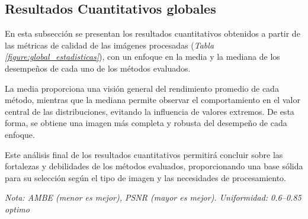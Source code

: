 \documentclass[sigchi]{acmart}
\begin{document}
\subsection{Resultados Cuantitativos globales} \label{subsec:resultados_cuantitativos}

En esta subsección se presentan los resultados cuantitativos obtenidos a partir de las métricas
de calidad de las imágenes procesadas (\emph{Tabla \ref{figure:global_estadisticas}}), con un enfoque en la media y la mediana de los
desempeños de cada uno de los métodos evaluados.

La media proporciona una visión general del rendimiento promedio de cada método, mientras que
la mediana permite observar el comportamiento en el valor central de las distribuciones,
evitando la influencia de valores extremos. De esta forma, se obtiene una imagen más completa y
robusta del desempeño de cada enfoque.

Este análisis final de los resultados cuantitativos permitirá concluir sobre las fortalezas y
debilidades de los métodos evaluados, proporcionando una base sólida para su selección según el
tipo de imagen y las necesidades de procesamiento.

\begin{table}[H]
	\centering
	\caption{Comparación estadística de los algoritmos de mejora de contraste}
	\label{tab:comparacion}
	\small

	\vspace{0.5em}
	\footnotesize%
	\textit{Nota: AMBE (menor es mejor), PSNR (mayor es mejor). Uniformidad: 0.6–0.85 optimo}
	\label{figure:global_estadisticas}
\end{table}
\end{document}
